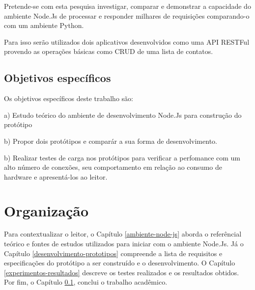   Pretende-se com esta pesquisa investigar, comparar e demonstrar a capacidade 
  do ambiente Node.Js de processar e responder milhares de requisições comparando-o com um ambiente Python.
  
  Para isso serão utilizados dois aplicativos desenvolvidos como uma API RESTFul provendo as operações
  básicas como \ac{CRUD} de uma lista de contatos.
  
\subsection{Objetivos específicos}

  Os objetivos específicos deste trabalho são:
  
    \begin{compactitem}
      \item[a)] Estudo teórico do ambiente de desenvolvimento Node.Js para construção do protótipo 
      \item[b)] Propor dois protótipos e comparár a sua forma de desenvolvimento.
      \item[b)] Realizar testes de carga nos protótipos para verificar a perfomance com um alto número de conexões,
      seu comportamento em relação ao consumo de hardware e apresentá-los ao leitor.
    \end{compactitem}
  
  
\section{Organização}
\label{organizacao}  

  Para contextualizar o leitor, o Capítulo \ref{ambiente-node-js} aborda o referêncial teórico e fontes de estudos utilizados para iniciar com o ambiente 
  Node.Js. Já o Capítulo \ref{desenvolvimento-prototipos} compreende a lista de requisitos e especificações do protótipo a ser construído e o
  desenvolvimento. O Capítulo \ref{experimentos-resultados} descreve os testes realizados e os resultados obtidos. 
  Por fim, o Capítulo \ref{}, conclui o trabalho acadêmico.